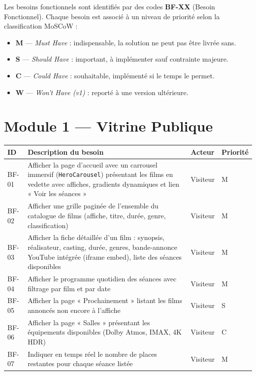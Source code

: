 \documentclass[12pt,a4paper,openany]{report}
\begin{document}
Les besoins fonctionnels sont identifiés par des codes \textbf{BF-XX} (Besoin Fonctionnel). Chaque besoin est associé à un niveau de priorité selon la classification MoSCoW :

\begin{itemize}[noitemsep]
  \item \textbf{M} — \textit{Must Have} : indispensable, la solution ne peut pas être livrée sans.
  \item \textbf{S} — \textit{Should Have} : important, à implémenter sauf contrainte majeure.
  \item \textbf{C} — \textit{Could Have} : souhaitable, implémenté si le temps le permet.
  \item \textbf{W} — \textit{Won't Have (v1)} : reporté à une version ultérieure.
\end{itemize}

\section{Module 1 — Vitrine Publique}

\begin{longtable}{p{1cm}p{6.5cm}lp{3.5cm}}
  \toprule
  \textbf{ID} & \textbf{Description du besoin} & \textbf{Acteur} & \textbf{Priorité} \\
  \midrule
  \endhead
  \bottomrule
  \endfoot

  BF-01 & Afficher la page d'accueil avec un carrousel immersif (\texttt{HeroCarousel}) présentant les films en vedette avec affiches, gradients dynamiques et lien « Voir les séances » & Visiteur & M \\[4pt]

  BF-02 & Afficher une grille paginée de l'ensemble du catalogue de films (affiche, titre, durée, genre, classification) & Visiteur & M \\[4pt]

  BF-03 & Afficher la fiche détaillée d'un film : synopsis, réalisateur, casting, durée, genres, bande-annonce YouTube intégrée (iframe embed), liste des séances disponibles & Visiteur & M \\[4pt]

  BF-04 & Afficher le programme quotidien des séances avec filtrage par film et par date & Visiteur & M \\[4pt]

  BF-05 & Afficher la page « Prochainement » listant les films annoncés non encore à l'affiche & Visiteur & S \\[4pt]

  BF-06 & Afficher la page « Salles » présentant les équipements disponibles (Dolby Atmos, IMAX, 4K HDR) & Visiteur & C \\[4pt]

  BF-07 & Indiquer en temps réel le nombre de places restantes pour chaque séance listée & Visiteur & M \\
\end{longtable}
\end{document}
